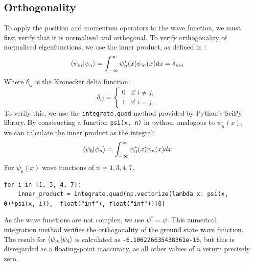 \documentclass[a4paper]{article}
\begin{document}
\subsection{Orthogonality}
To apply the position and momentum operators to the wave function, we must first verify that it is normalised and orthogonal. To verify orthogonality of normalised eigenfunctions, we use the inner product, as defined in \cite[\S3.1.2$\sim$p.25]{RefWorks:doc:60607bf68f08266f5a4c455d}:
\begin{equation}
\bra{\psi_m} \ket{\psi_n} =\int^\infty_{-\infty}\psi^*_n(x)\psi_m(x)dx = \delta_{mn}
\end{equation}
Where $\delta_{ij}$ is the Kronecker delta function:
\begin{equation}
{\displaystyle \delta _{ij}={\begin{cases}0&{\text{if }}i\neq j,\\1&{\text{if }}i=j.\end{cases}}}
\end{equation}
To verify this, we use the \lstinline$integrate.quad$ method provided by Python's SciPy library. By constructing a function \lstinline$psi(x, n)$ in python, analogous to $\psi_n(x)$, we can calculate the inner product as the integral:
\begin{equation}
\bra{\psi_0} \ket{\psi_n}=\int^\infty_{-\infty}\psi_0^*(x)\psi_n(x)dx
\end{equation}
For $\psi_n(x)$ wave functions of $n=1, 3, 4, 7$.
\begin{lstlisting}
for i in [1, 3, 4, 7]:
    inner_product = integrate.quad(np.vectorize(lambda x: psi(x, 0)*psi(x, i)), -float("inf"), float("inf"))[0]
\end{lstlisting} As the wave functions are not complex, we use $\psi^*=\psi$. This numerical integration method verifies the orthogonality of the ground state wave function. The result for $\bra{\psi_m} \ket{\psi_4}$ is calculated as \lstinline$-6.106226635438361e-16$, but this is disregarded as a floating-point inaccuracy, as all other values of $n$ return precisely zero.
\end{document}
